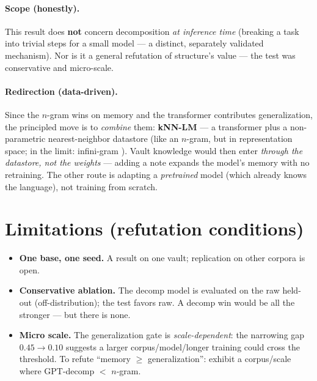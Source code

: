 \documentclass[11pt]{article}
\begin{document}
\paragraph{Scope (honestly).} This result does \textbf{not} concern decomposition \emph{at inference time}
(breaking a task into trivial steps for a small model --- a distinct, separately validated mechanism). Nor is it a
general refutation of structure's value --- the test was conservative and micro-scale.

\paragraph{Redirection (data-driven).} Since the $n$-gram wins on memory and the transformer contributes
generalization, the principled move is to \emph{combine} them: \textbf{kNN-LM} \cite{knnlm} --- a transformer plus a
non-parametric nearest-neighbor datastore (like an $n$-gram, but in representation space; in the limit:
infini-gram \cite{infinigram}). Vault knowledge would then enter \emph{through the datastore, not the weights} ---
adding a note expands the model's memory with no retraining. The other route is adapting a \emph{pretrained} model
(which already knows the language), not training from scratch.

\section{Limitations (refutation conditions)}
\begin{itemize}
  \item \textbf{One base, one seed.} A result on one vault; replication on other corpora is open.
  \item \textbf{Conservative ablation.} The decomp model is evaluated on the raw held-out (off-distribution); the
  test favors raw. A decomp win would be all the stronger --- but there is none.
  \item \textbf{Micro scale.} The generalization gate is \emph{scale-dependent}: the narrowing gap
  $0.45\!\to\!0.10$ suggests a larger corpus/model/longer training could cross the threshold. To refute
  ``memory $\geq$ generalization'': exhibit a corpus/scale where GPT-decomp $<$ $n$-gram.
\end{itemize}
\end{document}
